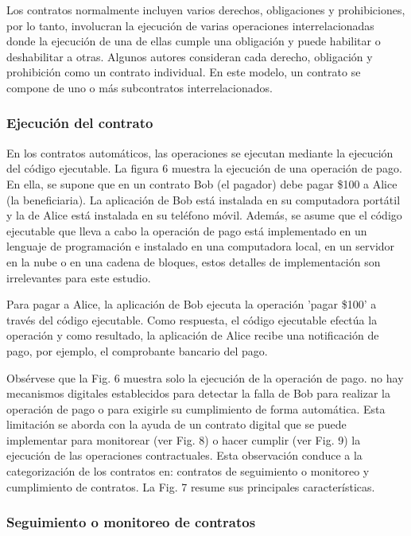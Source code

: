\documentclass[12pt]{report} %
\begin{document}
\begin{itemize}
Los contratos normalmente incluyen varios derechos, obligaciones y prohibiciones, por lo tanto, involucran la ejecución de varias operaciones interrelacionadas donde la ejecución de una de ellas cumple una obligación y puede habilitar o deshabilitar a otras. Algunos autores consideran cada derecho, obligación y prohibición como un contrato individual. En este modelo, un contrato se compone de uno o más subcontratos interrelacionados.


\subsubsection{Ejecución del contrato}

En los contratos automáticos, las operaciones se ejecutan mediante la ejecución del código ejecutable. La figura 6 muestra la ejecución de una operación de pago. En ella, se supone que en un contrato Bob (el pagador) debe pagar \$100 a Alice (la beneficiaria). La aplicación de Bob está instalada en su computadora portátil y la de Alice está instalada en su teléfono móvil. Además, se asume que el código ejecutable que lleva a cabo la operación de pago está implementado en un lenguaje de programación e instalado en una computadora local, en un servidor en la nube o en una cadena de bloques, estos detalles de implementación son irrelevantes para este estudio.

Para pagar a Alice, la aplicación de Bob ejecuta la operación 'pagar \$100' a través del código ejecutable. Como respuesta, el código ejecutable efectúa la operación y como resultado, la aplicación de Alice recibe una notificación de pago, por ejemplo, el comprobante bancario del pago.

Obsérvese que la Fig. 6 muestra solo la ejecución de la operación de pago. no hay mecanismos digitales establecidos para detectar la falla de Bob para realizar la operación de pago o para exigirle su cumplimiento de forma automática. Esta limitación  se aborda con la ayuda de un contrato digital que se puede implementar para monitorear (ver Fig. 8) o hacer cumplir (ver Fig. 9) la ejecución de las operaciones contractuales. Esta observación conduce a la categorización de los contratos en: contratos de seguimiento o monitoreo y cumplimiento de contratos. La Fig. 7 resume sus principales características.

\subsubsection{Seguimiento o monitoreo de contratos}


\end{itemize}
\end{document}

